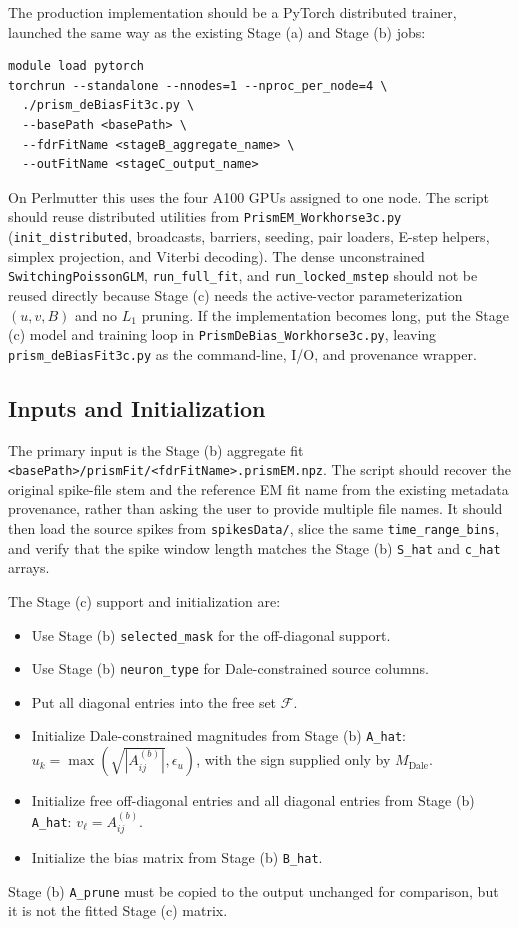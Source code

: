 \documentclass[11pt]{article}
\begin{document}
The production implementation should be a PyTorch distributed trainer, launched
the same way as the existing Stage (a) and Stage (b) jobs:
\begin{verbatim}
module load pytorch
torchrun --standalone --nnodes=1 --nproc_per_node=4 \
  ./prism_deBiasFit3c.py \
  --basePath <basePath> \
  --fdrFitName <stageB_aggregate_name> \
  --outFitName <stageC_output_name>
\end{verbatim}
On Perlmutter this uses the four A100 GPUs assigned to one node. The script
should reuse distributed utilities from \texttt{PrismEM\_Workhorse3c.py}
(\texttt{init\_distributed}, broadcasts, barriers, seeding, pair loaders,
E-step helpers, simplex projection, and Viterbi decoding). The dense
unconstrained \texttt{SwitchingPoissonGLM}, \texttt{run\_full\_fit}, and
\texttt{run\_locked\_mstep} should not be reused directly because Stage (c)
needs the active-vector parameterization $(u,v,B)$ and no $L_1$ pruning. If
the implementation becomes long, put the Stage (c) model and training loop in
\texttt{PrismDeBias\_Workhorse3c.py}, leaving \texttt{prism\_deBiasFit3c.py}
as the command-line, I/O, and provenance wrapper.

\subsection{Inputs and Initialization}

The primary input is the Stage (b) aggregate fit
\texttt{<basePath>/prismFit/<fdrFitName>.prismEM.npz}. The script should
recover the original spike-file stem and the reference EM fit name from the
existing metadata provenance, rather than asking the user to provide multiple
file names. It should then load the source spikes from
\texttt{spikesData/}, slice the same \texttt{time\_range\_bins}, and verify
that the spike window length matches the Stage (b) \texttt{S\_hat} and
\texttt{c\_hat} arrays.

The Stage (c) support and initialization are:
\begin{itemize}
    \item Use Stage (b) \texttt{selected\_mask} for the off-diagonal support.
    \item Use Stage (b) \texttt{neuron\_type} for Dale-constrained source columns.
    \item Put all diagonal entries into the free set $\mathcal{F}$.
    \item Initialize Dale-constrained magnitudes from Stage (b)
    \texttt{A\_hat}: $u_k=\max(\sqrt{|A_{ij}^{(b)}|},\epsilon_u)$, with the
    sign supplied only by $M_{\text{Dale}}$.
    \item Initialize free off-diagonal entries and all diagonal entries from
    Stage (b) \texttt{A\_hat}: $v_\ell=A_{ij}^{(b)}$.
    \item Initialize the bias matrix from Stage (b) \texttt{B\_hat}.
\end{itemize}
Stage (b) \texttt{A\_prune} must be copied to the output unchanged for
comparison, but it is not the fitted Stage (c) matrix.
\end{document}
